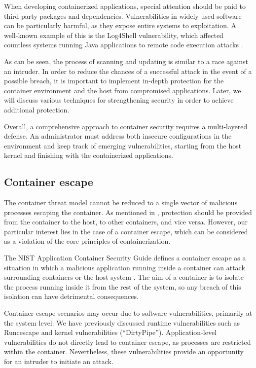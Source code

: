 When developing containerized applications, special attention should be paid to third-party packages and dependencies. Vulnerabilities in widely used software can be particularly harmful, as they expose entire systems to exploitation. A well-known example of this is the Log4Shell vulnerability, which affected countless systems running Java applications to remote code execution attacks \cite{nvd:CVE-2021-44228}.

As can be seen, the process of scanning and updating is similar to a race against an intruder. In order to reduce the chances of a successful attack in the event of a possible breach, it is important to implement in-depth protection for the container environment and the host from compromised applications. Later, we will discuss various techniques for strengthening security in order to achieve additional protection.

Overall, a comprehensive approach to container security requires a multi-layered defense. An administrator must address both insecure configurations in the environment and keep track of emerging vulnerabilities, starting from the host kernel and finishing with the containerized applications.

\subsection{Container escape}

The container threat model cannot be reduced to a single vector of malicious processes escaping the container. As mentioned in \cite{ieee:1}, protection should be provided from the container to the host, to other containers, and vice versa. However, our particular interest lies in the case of a container escape, which can be considered as a violation of the core principles of containerization.

The NIST Application Container Security Guide defines a container escape as a situation in which a malicious application running inside a container can attack surrounding containers or the host system \cite{nist:docker}. The aim of a container is to isolate the process running inside it from the rest of the system, so any breach of this isolation can have detrimental consequences.

Container escape scenarios may occur due to software vulnerabilities, primarily at the system level. We have previously discussed runtime vulnerabilities such as Runcescape and kernel vulnerabilities (``DirtyPipe''). Application-level vulnerabilities do not directly lead to container escape, as processes are restricted within the container. Nevertheless, these vulnerabilities provide an opportunity for an intruder to initiate an attack.

